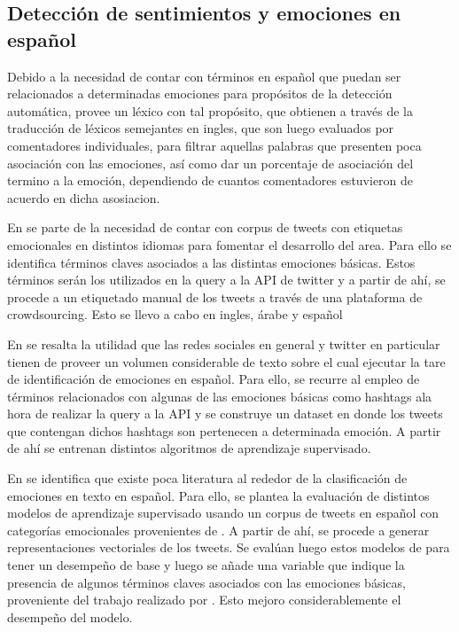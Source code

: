 \subsection{Detección de sentimientos y emociones en español}

Debido a la necesidad de contar con términos en español que puedan ser relacionados a determinadas emociones para propósitos de la detección automática, \cite{sidorov2012empirical} provee un léxico con tal propósito, que obtienen a través de la traducción de léxicos semejantes en ingles, que son luego evaluados por comentadores individuales, para filtrar aquellas palabras que presenten poca asociación con las emociones, así como dar un porcentaje de asociación del termino a la emoción, dependiendo de cuantos comentadores estuvieron de acuerdo en dicha asosiacion.

En \cite{mohammad2018semeval} se parte de la necesidad de contar con corpus de tweets con etiquetas emocionales en distintos idiomas para fomentar el desarrollo del area. Para ello se identifica términos claves asociados a las distintas emociones básicas. Estos términos serán los utilizados en la query a la API de twitter y a partir de ahí, se procede a un etiquetado manual de los tweets a través de una plataforma de crowdsourcing. Esto se llevo a cabo en ingles, árabe y español


En \cite{gil2013combining} se resalta la utilidad que las redes sociales en general y twitter en particular tienen de proveer un volumen considerable de texto sobre el cual ejecutar la tare de identificación de emociones en español. Para ello, se recurre al empleo de términos relacionados con algunas de las emociones básicas como hashtags ala hora de realizar la query a la API y se construye un dataset en donde los tweets que contengan dichos hashtags son pertenecen a determinada emoción. A partir de ahí se entrenan distintos algoritmos de aprendizaje supervisado.




En \cite{plaza2020improved} se identifica que existe poca literatura al rededor de la clasificación de emociones en texto en español. Para ello, se plantea la evaluación de distintos modelos de aprendizaje supervisado usando un corpus de tweets en español con categorías emocionales provenientes de \cite{mohammad2018semeval}. A partir de ahí, se  procede a generar  representaciones vectoriales de los tweets. Se evalúan luego estos modelos de para tener un desempeño de base y luego se añade una variable que indique la presencia de algunos términos claves asociados con las emociones básicas, proveniente del trabajo realizado por \cite{sidorov2012empirical}. Esto mejoro considerablemente el desempeño del modelo.



